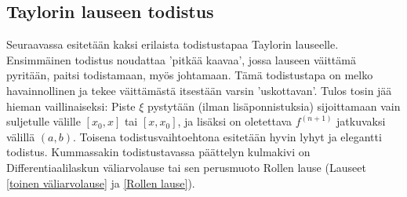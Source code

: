 \subsection*{Taylorin lauseen todistus}

Seuraavassa esitetään kaksi erilaista todistustapaa Taylorin lauseelle. Ensimmäinen todistus 
noudattaa 'pitkää kaavaa', jossa lauseen väittämä pyritään, paitsi todistamaan, myös
johtamaan. Tämä todistustapa on melko havainnollinen ja tekee väittämästä itsestään varsin
'uskottavan'. Tulos tosin jää hieman vaillinaiseksi: Piste $\xi$ pystytään (ilman
lisäponnistuksia) sijoittamaan vain suljetulle välille $[x_0,x]$ tai $[x,x_0]$, ja lisäksi
on oletettava $f^{(n+1)}$ jatkuvaksi välillä $(a,b)$. Toisena todistusvaihtoehtona esitetään
hyvin lyhyt ja elegantti todistus. Kummassakin todistustavassa päättelyn kulmakivi on
Differentiaalilaskun väliarvolause tai sen perusmuoto Rollen lause
(Lauseet \ref{toinen väliarvolause} ja \ref{Rollen lause}).

